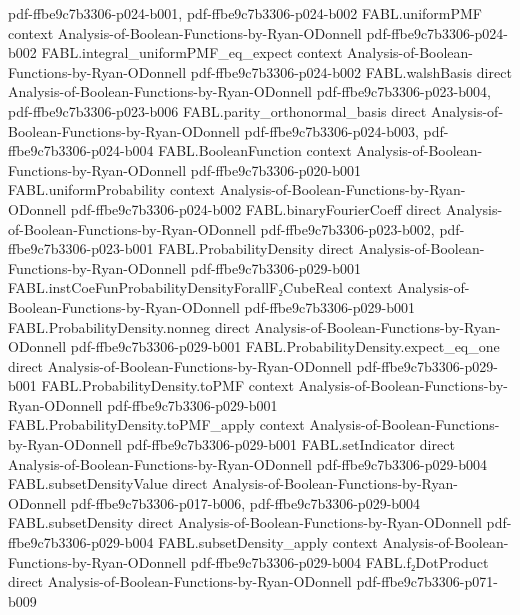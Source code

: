 \begin{theorem}
  {pdf-ffbe9c7b3306-p024-b001,
    pdf-ffbe9c7b3306-p024-b002}
\proofstep
  {FABL.uniformPMF}
  {context}
  {Analysis-of-Boolean-Functions-by-Ryan-ODonnell}
  {pdf-ffbe9c7b3306-p024-b002}
\proofstep
  {FABL.integral_uniformPMF_eq_expect}
  {context}
  {Analysis-of-Boolean-Functions-by-Ryan-ODonnell}
  {pdf-ffbe9c7b3306-p024-b002}
\proofstep
  {FABL.walshBasis}
  {direct}
  {Analysis-of-Boolean-Functions-by-Ryan-ODonnell}
  {pdf-ffbe9c7b3306-p023-b004,
    pdf-ffbe9c7b3306-p023-b006}
\proofstep
  {FABL.parity_orthonormal_basis}
  {direct}
  {Analysis-of-Boolean-Functions-by-Ryan-ODonnell}
  {pdf-ffbe9c7b3306-p024-b003,
    pdf-ffbe9c7b3306-p024-b004}
\proofstep
  {FABL.BooleanFunction}
  {context}
  {Analysis-of-Boolean-Functions-by-Ryan-ODonnell}
  {pdf-ffbe9c7b3306-p020-b001}
\proofstep
  {FABL.uniformProbability}
  {context}
  {Analysis-of-Boolean-Functions-by-Ryan-ODonnell}
  {pdf-ffbe9c7b3306-p024-b002}
\proofstep
  {FABL.binaryFourierCoeff}
  {direct}
  {Analysis-of-Boolean-Functions-by-Ryan-ODonnell}
  {pdf-ffbe9c7b3306-p023-b002,
    pdf-ffbe9c7b3306-p023-b001}
\proofstep
  {FABL.ProbabilityDensity}
  {direct}
  {Analysis-of-Boolean-Functions-by-Ryan-ODonnell}
  {pdf-ffbe9c7b3306-p029-b001}
\proofstep
  {FABL.instCoeFunProbabilityDensityForallF₂CubeReal}
  {context}
  {Analysis-of-Boolean-Functions-by-Ryan-ODonnell}
  {pdf-ffbe9c7b3306-p029-b001}
\proofstep
  {FABL.ProbabilityDensity.nonneg}
  {direct}
  {Analysis-of-Boolean-Functions-by-Ryan-ODonnell}
  {pdf-ffbe9c7b3306-p029-b001}
\proofstep
  {FABL.ProbabilityDensity.expect_eq_one}
  {direct}
  {Analysis-of-Boolean-Functions-by-Ryan-ODonnell}
  {pdf-ffbe9c7b3306-p029-b001}
\proofstep
  {FABL.ProbabilityDensity.toPMF}
  {context}
  {Analysis-of-Boolean-Functions-by-Ryan-ODonnell}
  {pdf-ffbe9c7b3306-p029-b001}
\proofstep
  {FABL.ProbabilityDensity.toPMF_apply}
  {context}
  {Analysis-of-Boolean-Functions-by-Ryan-ODonnell}
  {pdf-ffbe9c7b3306-p029-b001}
\proofstep
  {FABL.setIndicator}
  {direct}
  {Analysis-of-Boolean-Functions-by-Ryan-ODonnell}
  {pdf-ffbe9c7b3306-p029-b004}
\proofstep
  {FABL.subsetDensityValue}
  {direct}
  {Analysis-of-Boolean-Functions-by-Ryan-ODonnell}
  {pdf-ffbe9c7b3306-p017-b006,
    pdf-ffbe9c7b3306-p029-b004}
\proofstep
  {FABL.subsetDensity}
  {direct}
  {Analysis-of-Boolean-Functions-by-Ryan-ODonnell}
  {pdf-ffbe9c7b3306-p029-b004}
\proofstep
  {FABL.subsetDensity_apply}
  {context}
  {Analysis-of-Boolean-Functions-by-Ryan-ODonnell}
  {pdf-ffbe9c7b3306-p029-b004}
\proofstep
  {FABL.f₂DotProduct}
  {direct}
  {Analysis-of-Boolean-Functions-by-Ryan-ODonnell}
  {pdf-ffbe9c7b3306-p071-b009}

\end{theorem}
